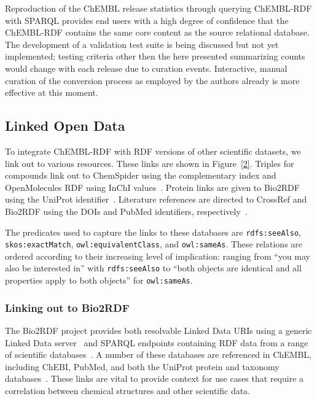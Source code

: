 \documentclass[10pt]{bmc_article}
\newenvironment{bmcformat}{\begin{raggedright}\baselineskip20pt\sloppy\setboolean{publ}{false}}{\end{raggedright}\baselineskip20pt\sloppy}
\begin{document}
\begin{bmcformat}
Reproduction of the ChEMBL release statistics through querying ChEMBL-RDF with SPARQL 
provides end users with a high degree of confidence that the ChEMBL-RDF contains the same 
core content as the source relational database. The development of a validation test suite
is being discussed but not yet implemented; testing criteria other then the here presented
summarizing counts would change with each release due to curation events. Interactive,
manual curation of the conversion process as employed by the authors already is more effective
at this moment.

\subsection*{Linked Open Data}

To integrate ChEMBL-RDF with RDF versions of other scientific datasets, we link out to various resources.
These links are shown in Figure~\ref{2}. Triples for compounds link out to ChemSpider 
using the complementary index and OpenMolecules RDF using InChI values~\cite{Pence2010,Bradley2009,Willighagen2011}.
Protein links are given to Bio2RDF~\cite{Belleau2008}
using the UniProt identifier~\cite{TheUniProtConsortium2010}. Literature references are directed to CrossRef and Bio2RDF 
using the DOIs and PubMed identifiers, respectively~\cite{Bilder2011}.

The predicates used to capture the links to these databases are
\verb+rdfs:seeAlso+, \verb+skos:exactMatch+, \verb+owl:equivalentClass+, and \verb+owl:sameAs+. 
These relations are ordered according to their increasing level of implication:
ranging from ``you may also be interested in'' with \verb+rdfs:seeAlso+ to
``both objects are identical  and all properties apply to both objects'' for
\verb+owl:sameAs+.

\subsubsection*{Linking out to Bio2RDF}

The Bio2RDF project provides both resolvable Linked Data URIs using a generic Linked Data
server~\cite{Ansell2011} and SPARQL endpoints containing RDF data from a range of scientific databases~\cite{Belleau2008}.
A number of these databases are referenced in ChEMBL, including ChEBI, PubMed, and both the
UniProt protein and taxonomy databases~\cite{TheUniProtConsortium2010}. These links are
vital to provide context for use cases that require a correlation between chemical
structures and other scientific data. 


\end{bmcformat}
\end{document}
